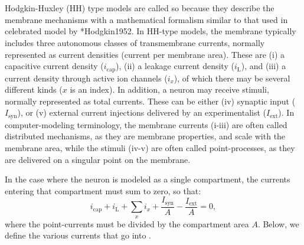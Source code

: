 \section{}
\label{sec:Neuron:membranecurrents}
Hodgkin-Huxley (HH) type models are called so because they describe the membrane mechanisms with a mathematical formalism similar to that used in  celebrated model by \citeasnoun**{Hodgkin1952}. In HH-type models, the membrane typically includes three autonomous classes of transmembrane currents, normally represented as current densities (current per membrane area). These are (i) a capacitive current density ($i_{\mathrm{cap}}$), (ii) a leakage current density ($i_{\mathrm{L}}$), and (iii) a current density through active ion channels ($i_x$), of which there may be several different kinds ($x$ is an index). In addition, a neuron may receive stimuli, normally represented as total currents. These can be either (iv) synaptic input ($I_{\mathrm{syn}}$), or (v) external current injections delivered by an experimentalist ($I_{\mathrm{ext}}$). In computer-modeling terminology, the membrane currents (i-iii) are often called distributed mechanisms, as they are membrane properties, and scale with the membrane area, while the stimuli (iv-v) are often called point-processes, as they are delivered on a singular point on the membrane. 

In the case where the neuron is modeled as a single compartment, the currents entering that compartment must sum to zero, so that:
\begin{equation}
i_{\mathrm{cap}}+ i_{\mathrm{L}} + \sum_x{i_x} +  \frac{I_{\mathrm{syn}}}{A} - \frac{I_{\mathrm{ext}}}{A} = 0,
\label{eq:Neuron:singlecomp_zerosum}
\end{equation}
where the point-currents must be divided by the compartment area $A$.   
 Below, we define the various currents that go into . 

